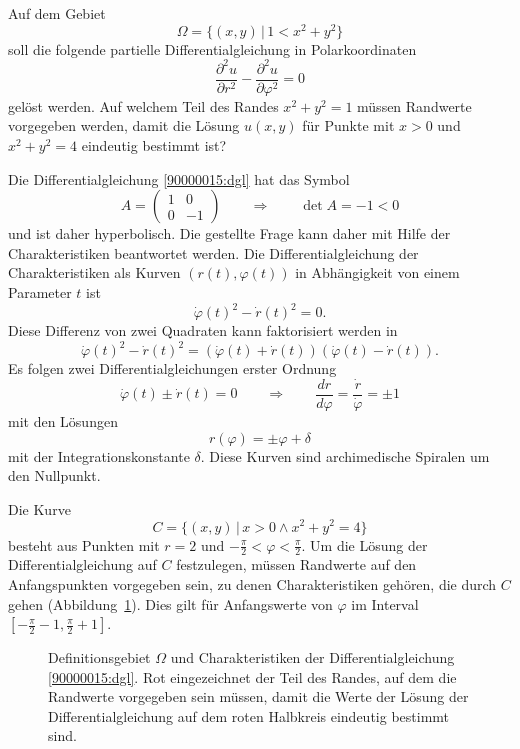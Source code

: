 Auf dem Gebiet
\[
\Omega = \{ (x,y)\,|\, 1 < x^2 + y^2\}
\]
soll die folgende partielle Differentialgleichung in Polarkoordinaten
\begin{equation}
\frac{\partial^2 u}{\partial r^2}
-
\frac{\partial^2 u}{\partial \varphi^2}
=
0
\label{90000015:dgl}
\end{equation}
gelöst werden.
Auf welchem Teil des Randes $x^2 +y^2 = 1$ müssen Randwerte vorgegeben
werden, damit die Lösung $u(x,y)$ für Punkte mit $x>0$ und $x^2 + y^2 = 4$
eindeutig bestimmt ist?

\begin{loesung}
Die Differentialgleichung \eqref{90000015:dgl} hat das Symbol
\[
A
=
\begin{pmatrix}
1&0\\
0&-1
\end{pmatrix}
\qquad\Rightarrow\qquad
\det A=-1<0
\]
und ist daher hyperbolisch.
Die gestellte Frage kann daher mit Hilfe der Charakteristiken beantwortet
werden.
Die Differentialgleichung der Charakteristiken als Kurven $(r(t),\varphi(t))$
in Abhängigkeit von einem Parameter $t$ ist
\[
\dot\varphi(t)^2 - \dot r(t)^2=0.
\]
Diese Differenz von zwei Quadraten kann faktorisiert werden in
\[
\dot\varphi(t)^2 - \dot r(t)^2
=
(\dot\varphi(t) + \dot r(t))
(\dot\varphi(t) - \dot r(t)).
\]
Es folgen zwei Differentialgleichungen erster Ordnung
\[
\dot\varphi(t)\pm\dot r(t) = 0
\qquad\Rightarrow\qquad
\frac{dr}{d\varphi}
=
\frac{\dot r}{\dot \varphi}
=
\pm 1
\]
mit den Lösungen
\[
r(\varphi) =  \pm \varphi + \delta
\]
mit der Integrationskonstante $\delta$.
Diese Kurven sind archimedische Spiralen um den Nullpunkt.

Die Kurve 
\[
C
=
\{ (x,y)\,|\, x>0\wedge x^2 +y^2=4\}
\]
besteht aus Punkten mit $r=2$ und $-\frac{\pi}{2}<\varphi<\frac{\pi}2$.
Um die Lösung der Differentialgleichung auf $C$ festzulegen, müssen
Randwerte auf den Anfangspunkten vorgegeben sein, zu denen Charakteristiken
gehören, die durch $C$ gehen (Abbildung~\ref{90000015:fig}).
Dies gilt für Anfangswerte von $\varphi$ im Interval
$[-\frac{\pi}2-1,\frac{\pi}2+1]$.
\begin{figure}
\centering
{}
\caption{Definitionsgebiet $\Omega$ und Charakteristiken der
Differentialgleichung \eqref{90000015:dgl}.
Rot eingezeichnet der Teil des Randes, auf dem die Randwerte vorgegeben
sein müssen, damit die Werte der Lösung der Differentialgleichung auf dem
roten Halbkreis eindeutig bestimmt sind.
\label{90000015:fig}}
\end{figure}
\end{loesung}


